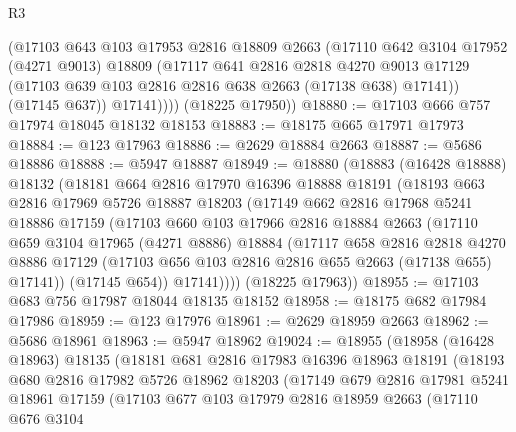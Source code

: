 \begin{lexlean}{R3}
\begin{coremodule}
            (@17103
              @643
              @103
              @17953
              @2816
              @18809
              @2663
              (@17110
                @642
                @3104
                @17952
                (@4271 @9013)
                @18809
                (@17117
                  @641
                  @2816
                  @2818
                  @4270
                  @9013
                  @17129
                  (@17103 @639 @103 @2816 @2816 @638 @2663 (@17138 @638) @17141))
                (@17145 @637))
              @17141))))
      (@18225 @17950))
@18880 := @17103 @666 @757 @17974 @18045 @18132 @18153
@18883 := @18175 @665 @17971 @17973
@18884 := @123 @17963
@18886 := @2629 @18884 @2663
@18887 := @5686 @18886
@18888 := @5947 @18887
@18949 := @18880
    (@18883
      (@16428 @18888)
      @18132
      (@18181
        @664
        @2816
        @17970
        @16396
        @18888
        @18191
        (@18193
          @663
          @2816
          @17969
          @5726
          @18887
          @18203
          (@17149
            @662
            @2816
            @17968
            @5241
            @18886
            @17159
            (@17103
              @660
              @103
              @17966
              @2816
              @18884
              @2663
              (@17110
                @659
                @3104
                @17965
                (@4271 @8886)
                @18884
                (@17117
                  @658
                  @2816
                  @2818
                  @4270
                  @8886
                  @17129
                  (@17103 @656 @103 @2816 @2816 @655 @2663 (@17138 @655) @17141))
                (@17145 @654))
              @17141))))
      (@18225 @17963))
@18955 := @17103 @683 @756 @17987 @18044 @18135 @18152
@18958 := @18175 @682 @17984 @17986
@18959 := @123 @17976
@18961 := @2629 @18959 @2663
@18962 := @5686 @18961
@18963 := @5947 @18962
@19024 := @18955
    (@18958
      (@16428 @18963)
      @18135
      (@18181
        @681
        @2816
        @17983
        @16396
        @18963
        @18191
        (@18193
          @680
          @2816
          @17982
          @5726
          @18962
          @18203
          (@17149
            @679
            @2816
            @17981
            @5241
            @18961
            @17159
            (@17103
              @677
              @103
              @17979
              @2816
              @18959
              @2663
              (@17110
                @676
                @3104

\end{coremodule}
\end{lexlean}
